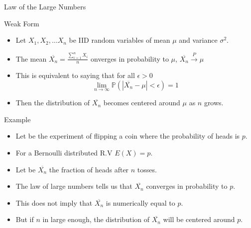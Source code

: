 \documentclass[handout]{beamer}
\begin{document}
\begin{frame}{Law of the Large Numbers}
\scriptsize{
\begin{block}{Weak Form}
\begin{itemize}
 \item Let $X_{1},X_{2},\dots X_{n}$ be IID random variables of mean $\mu$ and variance $\sigma^2$.
 \item The mean $\overline{X_{n}} =\frac{\sum_{i=1}^{n}X_{i}}{n}$ onverges in probability to $\mu$, $\overline{X_{n}} \overset{P}{\rightarrow} \mu$   
 \item This is equivalent to saying that for all $\epsilon > 0$
 \begin{displaymath}
  \lim_{n\rightarrow \infty} \mathbb{P}(|\overline{X_{n}} - \mu| < \epsilon)=1
 \end{displaymath}
\item Then the distribution of  $\overline{X_{n}}$ becomes centered around $\mu$ as $n$ grows.
\end{itemize}
\end{block}
\begin{block}{Example}
\begin{itemize}
 \item Let be the experiment of flipping a coin where the probability of heads is $p$.
 \item For a Bernoulli distributed R.V $E(X)=p$.
 \item Let be $\overline{X_{n}}$ the fraction of heads after $n$ tosses.
 \item The law of large numbers tells us that  $\overline{X_{n}}$ converges in probability to $p$.
 \item This does not imply that  $\overline{X_{n}}$ is numerically equal to $p$.
 \item  But if $n$ in large enough, the distribution of $\overline{X_{n}}$ will be centered around $p$.
\end{itemize}

 
\end{block}



}
 
\end{frame}
\end{document}
